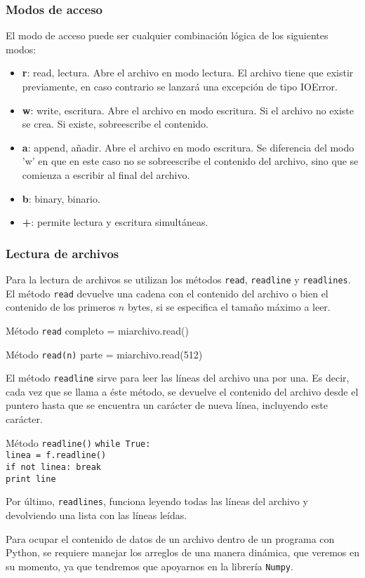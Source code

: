 \begin{frame}[fragile]
\frametitle{Modos de acceso}
El modo de acceso puede ser cualquier combinaci\'{o}n l\'{o}gica de los siguientes modos:
\begin{itemize}[<+->]
\item \textbf{r}: read, lectura. Abre el archivo en modo lectura. El archivo tiene que existir previamente, en caso contrario se lanzar\'{a} una excepci\'{o}n de tipo IOError.
\item \textbf{w}: write, escritura. Abre el archivo en modo escritura. Si el archivo no existe se crea. Si existe, sobreescribe el contenido.
\item \textbf{a}: append, añadir. Abre el archivo en modo escritura. Se diferencia del modo 'w' en que en este caso no se sobreescribe el contenido del archivo, sino que se comienza a escribir al final del archivo.
\item \textbf{b}: binary, binario.
\item \textbf{+}: permite lectura y escritura simult\'{a}neas.
\end{itemize}
\end{frame}
\begin{frame}[fragile]
\frametitle{Lectura de archivos}
Para la lectura de archivos se utilizan los métodos \texttt{read}, \texttt{readline} y \texttt{readlines}.
\\
\bigskip
El m\'{e}todo \texttt{read} devuelve una cadena con el contenido del archivo o bien el contenido de los primeros $n$ bytes, si se especifica el tamaño m\'{a}ximo a leer.
\begin{exampleblock}{M\'{e}todo \texttt{read}}
completo = miarchivo.read()
\end{exampleblock}
\pause
\begin{exampleblock}{M\'{e}todo \texttt{read(n)}}
parte = miarchivo.read(512)
\end{exampleblock}
\end{frame}
\begin{frame}[fragile]
El m\'{e}todo \texttt{readline} sirve para leer las l\'{i}neas del archivo una por una. Es decir, cada vez que se llama a \'{e}ste m\'{e}todo, se devuelve el contenido del archivo desde el puntero hasta que se encuentra un car\'{a}cter de nueva l\'{i}nea, incluyendo este car\'{a}cter.
\begin{exampleblock}{M\'{e}todo \texttt{readline()}}
\texttt{while True: \\
\hspace{0.2cm}linea = f.readline() \\
\hspace{0.2cm}if not linea: break \\
\hspace{0.2cm}print line}
\end{exampleblock}
Por \'{u}ltimo, \texttt{readlines}, funciona leyendo todas las l\'{i}neas del archivo y devolviendo una lista con las l\'{i}neas le\'{i}das. 
\end{frame}
\begin{frame}
Para ocupar el contenido de datos de un archivo dentro de un programa con Python, se requiere manejar los arreglos de una manera din\'{a}mica, que veremos en su momento, ya que tendremos que apoyarnos en la librer\'{i}a \texttt{Numpy}.
\end{frame}